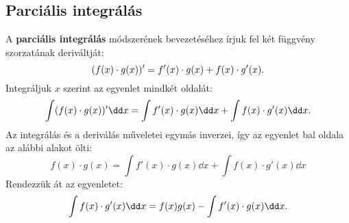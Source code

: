 \subsection{Parciális integrálás}

\begin{blueBox}
  A \textbf{parciális integrálás} módszerének bevezetéséhez írjuk fel két
  függvény szorzatának deriváltját:
  \[
    (f(x) \cdot g(x))' = f'(x) \cdot g(x) + f(x) \cdot g'(x)
    \text.
  \]
  Integráljuk $x$ szerint az egyenlet mindkét oldalát:
  \[
    \int (f(x) \cdot g(x))' \dd x = \int f'(x) \cdot g(x) \dd x +
    \int f(x) \cdot g'(x) \dd x
    \text.
  \]
  Az integrálás és a deriválás műveletei egymás inverzei, így az egyenlet bal
  oldala az alábbi alakot ölti:
  \[
    f(x) \cdot g(x) = \int f'(x) \cdot g(x) \dd x + \int f(x) \cdot g'(x) \dd x
  \]
  Rendezzük át az egyenletet:
  \[
    \int f(x) \cdot g'(x) \dd x = f(x) g(x) - \int f'(x) \cdot g(x) \dd x
    \text.
  \]
\end{blueBox}

\vfill

